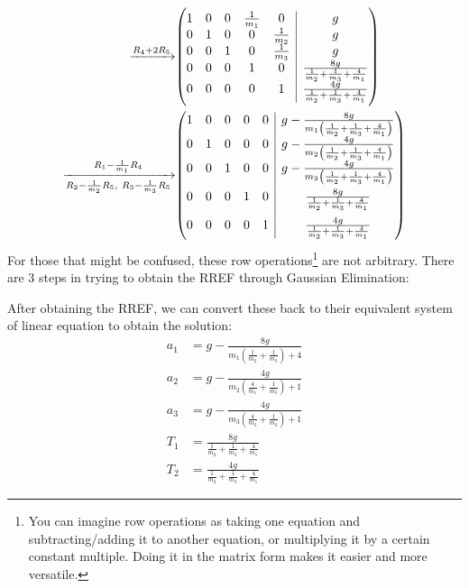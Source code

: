 \documentclass[11pt]{article}
\makeatletter
\newenvironment{amatrix}[1]{%
	\left(\begin{array}{@{}*{#1}{c} | c@{}}
	}{%
	\end{array}\right)
}						%
\makeatother
\begin{document}
\begin{appendices}
\begin{align*}
			\xrightarrow[]{R_4 + 2R_5}
			&\begin{amatrix}{5}
			1 & 0 & 0 & \frac{1}{m_1} & 0 & g \\  
			0 & 1 & 0 & 0 & \frac{1}{m_2} & g \\
			0 & 0 & 1 & 0 & \frac{1}{m_3} & g \\
			0 & 0 & 0 & 1 & 0 & \frac{8g}{\frac{1}{m_2} + \frac{1}{m_3} + \frac{4}{m_1}} \\
			0 & 0 & 0 & 0 & 1 & \frac{4g}{\frac{1}{m_2} + \frac{1}{m_3} + \frac{4}{m_1}}
			\end{amatrix} \\
			\xrightarrow[R_2-\frac{1}{m_2}R_5,~R_3-\frac{1}{m_3}R_5]{R_1 - \frac{1}{m_1}R_4}
			&\begin{amatrix}{5}
			1 & 0 & 0 & 0 & 0 & g - \frac{8g}{m_1\left(\frac{1}{m_2} + \frac{1}{m_3} + \frac{4}{m_1}\right)} \\  
			0 & 1 & 0 & 0 & 0 & g - \frac{4g}{m_2\left(\frac{1}{m_2} + \frac{1}{m_3} + \frac{4}{m_1}\right)}\\
			0 & 0 & 1 & 0 & 0 & g - \frac{4g}{m_3\left(\frac{1}{m_2} + \frac{1}{m_3} + \frac{4}{m_1}\right)}\\[1em]
			0 & 0 & 0 & 1 & 0 & \frac{8g}{\frac{1}{m_2} + \frac{1}{m_3} + \frac{4}{m_1}} \\[1em]
			0 & 0 & 0 & 0 & 1 & \frac{4g}{\frac{1}{m_2} + \frac{1}{m_3} + \frac{4}{m_1}}
			\end{amatrix}
		\end{align*}
		For those that might be confused, these row operations\footnote{You can imagine row operations as taking one equation and subtracting/adding it to another equation, or multiplying it by a certain constant multiple. Doing it in the matrix form makes it easier and more versatile. } are not arbitrary. There are 3 steps in trying to obtain the RREF through Gaussian Elimination:
	
		After obtaining the RREF, we can convert these back to their equivalent system of linear equation to obtain the solution:
		\begin{align*}
			a_1 &= g - \frac{8g}{m_1\left(\frac{1}{m_2} + \frac{1}{m_3} \right) + 4} \\
			a_2 &= g - \frac{4g}{m_2\left( \frac{4}{m_1} + \frac{1}{m_3}\right) + 1} \\ 
			a_3 &= g - \frac{4g}{m_3\left(\frac{4}{m_3} + \frac{1}{m_2}\right) + 1} \\
			T_1 &= \frac{8g}{\frac{1}{m_2} + \frac{1}{m_3} + \frac{4}{m_1}} \\
			T_2 &= \frac{4g}{\frac{1}{m_2} + \frac{1}{m_3} + \frac{4}{m_1}}
		\end{align*}
		

\end{appendices}
\end{document}
